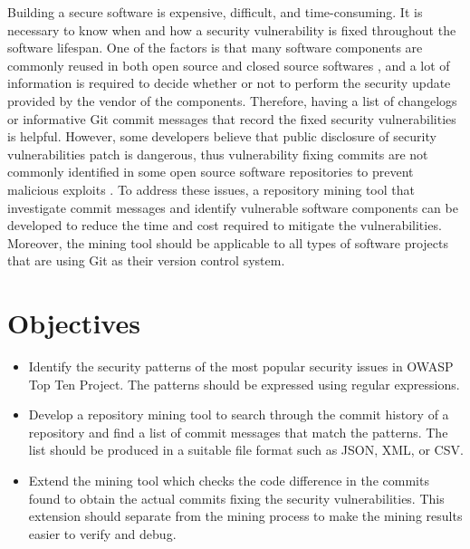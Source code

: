 \documentclass[12pt, a4paper]{report}
\begin{document}
Building a secure software is expensive, difficult, and time-consuming. It is necessary to know when
and how a security vulnerability is fixed throughout the software lifespan. One of the factors is
that many software components are commonly reused in both open source and closed source softwares
\cite{khan_2001}, and a lot of information is required to decide whether or not to perform the
security update provided by the vendor of the components. Therefore, having a list of changelogs or
informative Git commit messages that record the fixed security vulnerabilities is helpful. However,
some developers believe that public disclosure of security vulnerabilities patch is dangerous, thus
vulnerability fixing commits are not commonly identified in some open source software repositories
to prevent malicious exploits \cite{arora_2005}. To address these issues, a repository mining tool
that investigate commit messages and identify vulnerable software components can be developed to
reduce the time and cost required to mitigate the vulnerabilities. Moreover, the mining tool should
be applicable to all types of software projects that are using Git as their version control system.

\section{Objectives}
\label{sec:objectives}
\begin{itemize}
	\item Identify the security patterns of the most popular security issues in OWASP Top Ten Project.
	The patterns should be expressed using regular expressions.
	\item Develop a repository mining tool to search through the commit history of a repository and
	find a list of commit messages that match the patterns. The list should be produced in a suitable
	file format such as JSON, XML, or CSV.
	\item Extend the mining tool which checks the code difference in the commits found to obtain the
	actual commits fixing the security vulnerabilities. This extension should separate from the mining
	process to make the mining results easier to verify and debug.
\end{itemize}
\end{document}

